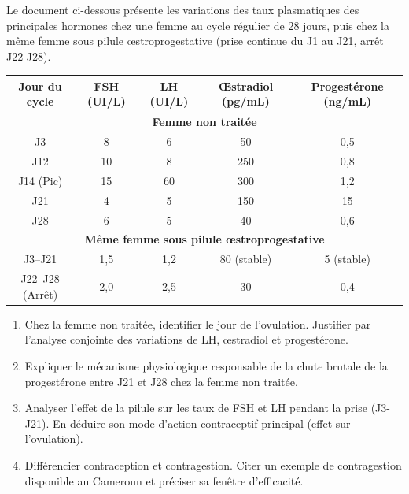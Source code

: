 \documentclass[11pt]{article}
\begin{document}
\begin{exercice}
Le document ci-dessous présente les variations des taux plasmatiques des principales hormones chez une femme au cycle régulier de 28 jours, puis chez la même femme sous pilule \oe{}stroprogestative (prise continue du J1 au J21, arrêt J22-J28).
\begin{center}
\begin{tabular}{|c|c|c|c|c|}
\hline
\textbf{Jour du cycle} & \textbf{FSH (UI/L)} & \textbf{LH (UI/L)} & \textbf{\OE{}stradiol (pg/mL)} & \textbf{Progestérone (ng/mL)} \\
\hline
\multicolumn{5}{|c|}{\textbf{Femme non traitée}} \\
\hline
J3 & 8 & 6 & 50 & 0,5 \\
J12 & 10 & 8 & 250 & 0,8 \\
J14 (Pic) & 15 & 60 & 300 & 1,2 \\
J21 & 4 & 5 & 150 & 15 \\
J28 & 6 & 5 & 40 & 0,6 \\
\hline
\multicolumn{5}{|c|}{\textbf{Même femme sous pilule \oe{}stroprogestative}} \\
\hline
J3--J21 & 1,5 & 1,2 & 80 (stable) & 5 (stable) \\
J22--J28 (Arrêt) & 2,0 & 2,5 & 30 & 0,4 \\
\hline
\end{tabular}
\end{center}
\begin{enumerate}
    \item Chez la femme non traitée, identifier le jour de l'ovulation. Justifier par l'analyse conjointe des variations de LH, \oe{}stradiol et progestérone.
    \item Expliquer le mécanisme physiologique responsable de la chute brutale de la progestérone entre J21 et J28 chez la femme non traitée.
    \item Analyser l'effet de la pilule sur les taux de FSH et LH pendant la prise (J3-J21). En déduire son mode d'action contraceptif principal (effet sur l'ovulation).
    \item Différencier contraception et contragestion. Citer un exemple de contragestion disponible au Cameroun et préciser sa fenêtre d'efficacité.
\end{enumerate}
\end{exercice}
\end{document}
